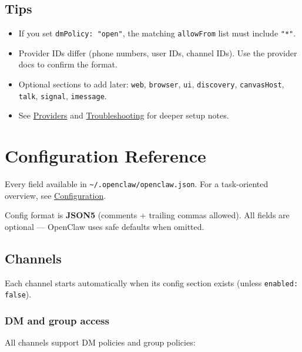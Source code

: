 \subsection{Tips}


\begin{itemize}
  \item If you set \texttt{dmPolicy: "open"}, the matching \texttt{allowFrom} list must include \texttt{"*"}.
  \item Provider IDs differ (phone numbers, user IDs, channel IDs). Use the provider docs to confirm the format.
  \item Optional sections to add later: \texttt{web}, \texttt{browser}, \texttt{ui}, \texttt{discovery}, \texttt{canvasHost}, \texttt{talk}, \texttt{signal}, \texttt{imessage}.
  \item See \href{/providers}{Providers} and \href{/gateway/troubleshooting}{Troubleshooting} for deeper setup notes.
\end{itemize}



\clearpage

\section{Configuration Reference}


Every field available in \texttt{\textasciitilde{}/.openclaw/openclaw.json}. For a task-oriented overview, see \href{/gateway/configuration}{Configuration}.

Config format is \textbf{JSON5} (comments + trailing commas allowed). All fields are optional — OpenClaw uses safe defaults when omitted.

\hrulefill


\subsection{Channels}


Each channel starts automatically when its config section exists (unless \texttt{enabled: false}).

\subsubsection{DM and group access}


All channels support DM policies and group policies:


